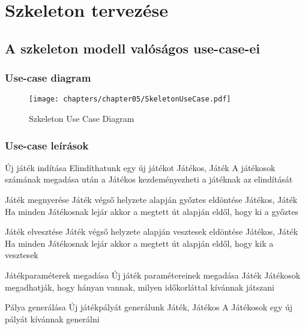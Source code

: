 %
\chapter{Szkeleton tervezése}

\thispagestyle{fancy}

\section{A szkeleton modell valóságos use-case-ei}

\subsection{Use-case diagram}

\begin{figure}[h]
\begin{center}
\texttt{[image: chapters/chapter05/SkeletonUseCase.pdf]}
\caption{Szkeleton Use Case Diagram}
\label{fig:SzkeletonUseCase}
\end{center}
\end{figure}

\subsection{Use-case leírások}

\usecase%
{Új játék indítása}%
{Elindíthatunk egy új játékot}%
{Játékos, Játék}%
{A játékosok számának megadása után a Játékos kezdeményezheti a játéknak az elindítását}

\usecase%
{Játék megnyerése}%
{Játék végső helyzete alapján győztes eldöntése}%
{Játékos, Játék}%
{Ha minden Játékosnak lejár akkor a megtett út alapján eldől, hogy ki a győztes}

\usecase%
{Játék elvesztése}%
{Játék végső helyzete alapján vesztesek eldöntése}%
{Játékos, Játék}%
{Ha minden Játékosnak lejár akkor a megtett út alapján eldől, hogy kik a vesztesek}

\usecase%
{Játékparaméterek megadása}%
{Új játék paramétereinek megadása}%
{Játék}%
{Játékosok megadhatják, hogy hányan vannak, milyen időkorláttal kívánnak játszani}

\usecase%
{Pálya generálása}%
{Új játékpályát generálunk}%
{Játék, Játékos}%
{A Játékosok egy új pályát kívánnak generálni}

